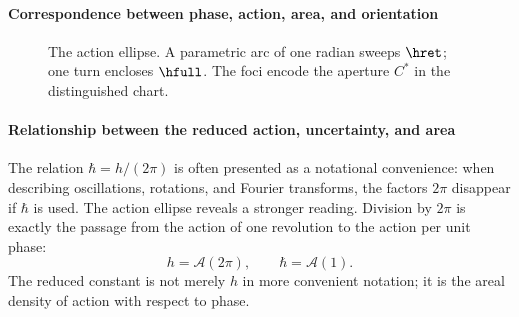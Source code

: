 \paragraph{Correspondence between phase, action, area, and orientation}

\begin{figure}[H]
\centering
{}
\caption{The action ellipse. A parametric arc of one radian sweeps
\(\hret\); one turn encloses \(\hfull\). The foci encode the aperture
\(C^*\) in the distinguished chart.}
\label{fig:elipse-accion}
\end{figure}

\paragraph{Relationship between the reduced action, uncertainty, and area}

The relation \(\hbar=h/(2\pi)\) is often presented as a notational
convenience: when describing oscillations, rotations, and Fourier transforms,
the factors \(2\pi\) disappear if \(\hbar\) is used. The action ellipse
reveals a stronger reading. Division by \(2\pi\) is exactly the
passage from the action of one revolution to the action per unit phase:
\[
h=\mathcal A(2\pi),\qquad \hbar=\mathcal A(1).
\]
The reduced constant is not merely \(h\) in more convenient notation; it is the
areal density of action with respect to phase.

